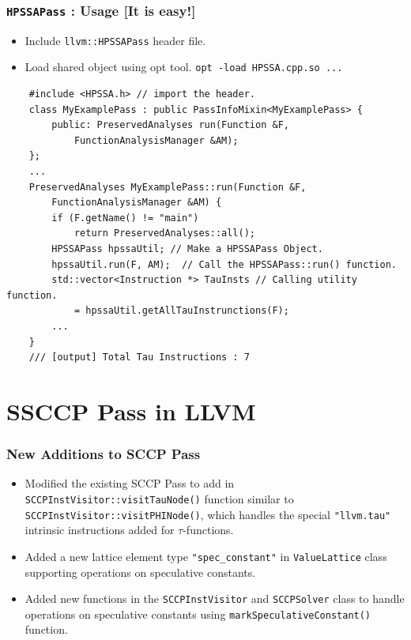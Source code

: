 \documentclass{beamer}
\begin{document}
\begin{frame}[fragile]
	\frametitle{\texttt{HPSSAPass} : Usage [It is easy!]}
	\begin{itemize}
		\item Include \texttt{llvm::HPSSAPass} header file.
		\item Load shared object using opt tool. \texttt{opt -load HPSSA.cpp.so ...} 
	\end{itemize}
	\begin{verbatim}
	#include <HPSSA.h> // import the header.
	class MyExamplePass : public PassInfoMixin<MyExamplePass> {
		public: PreservedAnalyses run(Function &F, 
			FunctionAnalysisManager &AM);
	};
	...
	PreservedAnalyses MyExamplePass::run(Function &F, 
		FunctionAnalysisManager &AM) {
		if (F.getName() != "main")
			return PreservedAnalyses::all();
		HPSSAPass hpssaUtil; // Make a HPSSAPass Object.
		hpssaUtil.run(F, AM);  // Call the HPSSAPass::run() function.
		std::vector<Instruction *> TauInsts // Calling utility function.
			= hpssaUtil.getAllTauInstrunctions(F);
		...
	}
	/// [output] Total Tau Instructions : 7 
	\end{verbatim}
\end{frame}

\section{SSCCP Pass in LLVM}

\begin{frame}
	\frametitle{New Additions to SCCP Pass}
	\begin{itemize}
		\item Modified the existing SCCP Pass to add in \texttt{SCCPInstVisitor::visitTauNode()} function similar to \texttt{SCCPInstVisitor::visitPHINode()}, which handles the special \texttt{"llvm.tau"} intrinsic instructions added for $\tau$-functions.
		\item Added a new lattice element type \texttt{"spec_constant"} in \texttt{ValueLattice} class supporting operations on speculative constants. 
		\item Added new functions in the \texttt{SCCPInstVisitor} and \texttt{SCCPSolver} class to handle operations on speculative constants using \texttt{markSpeculativeConstant()} function.
	\end{itemize}
\end{frame}
\end{document}
